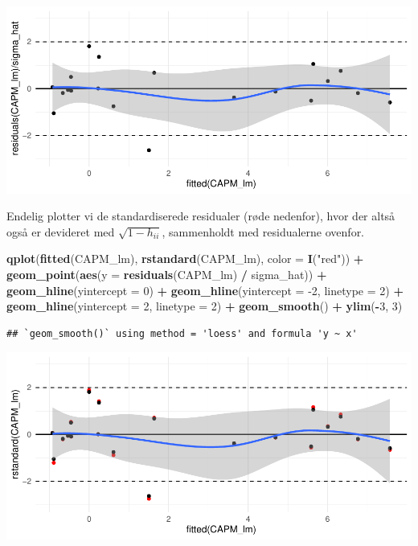 \documentclass[
]{article}
\newenvironment{Shaded}{\begin{snugshade}}{\end{snugshade}}
\newcommand{\DataTypeTok}[1]{\textcolor[rgb]{0.13,0.29,0.53}{#1}}
\newcommand{\DecValTok}[1]{\textcolor[rgb]{0.00,0.00,0.81}{#1}}
\newcommand{\KeywordTok}[1]{\textcolor[rgb]{0.13,0.29,0.53}{\textbf{#1}}}
\newcommand{\NormalTok}[1]{#1}
\newcommand{\OperatorTok}[1]{\textcolor[rgb]{0.81,0.36,0.00}{\textbf{#1}}}
\newcommand{\StringTok}[1]{\textcolor[rgb]{0.31,0.60,0.02}{#1}}
\begin{document}
\includegraphics{matstatproblems20-21_files/figure-latex/unnamed-chunk-95-1.pdf}

Endelig plotter vi de standardiserede residualer (røde nedenfor), hvor
der altså også er devideret med \(\sqrt{1 - h_{ii}}\), sammenholdt med
residualerne ovenfor.

\begin{Shaded}
\begin{Highlighting}[]
\KeywordTok{qplot}\NormalTok{(}\KeywordTok{fitted}\NormalTok{(CAPM_lm), }\KeywordTok{rstandard}\NormalTok{(CAPM_lm), }\DataTypeTok{color =} \KeywordTok{I}\NormalTok{(}\StringTok{"red"}\NormalTok{)) }\OperatorTok{+}\StringTok{ }
\StringTok{    }\KeywordTok{geom_point}\NormalTok{(}\KeywordTok{aes}\NormalTok{(}\DataTypeTok{y =} \KeywordTok{residuals}\NormalTok{(CAPM_lm) }\OperatorTok{/}\StringTok{ }\NormalTok{sigma_hat)) }\OperatorTok{+}\StringTok{ }
\StringTok{    }\KeywordTok{geom_hline}\NormalTok{(}\DataTypeTok{yintercept =} \DecValTok{0}\NormalTok{) }\OperatorTok{+}
\StringTok{    }\KeywordTok{geom_hline}\NormalTok{(}\DataTypeTok{yintercept =} \DecValTok{-2}\NormalTok{, }\DataTypeTok{linetype =} \DecValTok{2}\NormalTok{) }\OperatorTok{+}
\StringTok{    }\KeywordTok{geom_hline}\NormalTok{(}\DataTypeTok{yintercept =} \DecValTok{2}\NormalTok{, }\DataTypeTok{linetype =} \DecValTok{2}\NormalTok{) }\OperatorTok{+}
\StringTok{    }\KeywordTok{geom_smooth}\NormalTok{() }\OperatorTok{+}
\StringTok{    }\KeywordTok{ylim}\NormalTok{(}\OperatorTok{-}\DecValTok{3}\NormalTok{, }\DecValTok{3}\NormalTok{)}
\end{Highlighting}
\end{Shaded}

\begin{verbatim}
## `geom_smooth()` using method = 'loess' and formula 'y ~ x'
\end{verbatim}

\includegraphics{matstatproblems20-21_files/figure-latex/unnamed-chunk-96-1.pdf}
\end{document}

